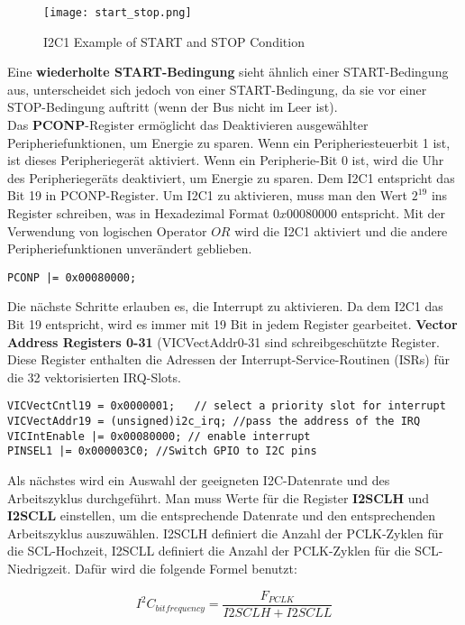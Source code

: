 \begin{figure}[!hb]
	\centering
	\texttt{[image: start\_stop.png]}
	\caption[I2C1 Example of START and STOP Condition]{I2C1 Example of START and STOP Condition}
	\label{fig:startstop}
\end{figure}

Eine \textbf{wiederholte START-Bedingung} sieht ähnlich einer START-Bedingung aus, unterscheidet sich jedoch von einer START-Bedingung, da sie vor einer STOP-Bedingung auftritt (wenn der Bus nicht im Leer ist).\\

Das \textbf{PCONP}-Register ermöglicht das Deaktivieren ausgewählter Peripheriefunktionen, um Energie zu sparen. Wenn ein Peripheriesteuerbit 1 ist, ist dieses Peripheriegerät aktiviert. Wenn ein Peripherie-Bit 0 ist, wird die Uhr des Peripheriegeräts deaktiviert, um Energie zu sparen. Dem I2C1 entspricht das Bit 19 in PCONP-Register. Um I2C1 zu aktivieren, muss man den Wert $2^{19}$ ins Register schreiben, was in Hexadezimal Format $0x00080000$ entspricht. Mit der Verwendung von logischen Operator $OR$ wird die I2C1 aktiviert und die andere Peripheriefunktionen unverändert geblieben.
\begin{lstlisting}
PCONP |= 0x00080000;
\end{lstlisting}
Die nächste Schritte erlauben es, die Interrupt zu aktivieren. Da dem I2C1 das Bit 19 entspricht, wird es immer mit 19 Bit in jedem Register gearbeitet. \textbf{Vector Address Registers 0-31} (VICVectAddr0-31 sind schreibgeschützte Register. Diese Register enthalten die Adressen der Interrupt-Service-Routinen (ISRs) für die 32 vektorisierten IRQ-Slots.
\begin{lstlisting}
VICVectCntl19 = 0x0000001;   // select a priority slot for interrupt
VICVectAddr19 = (unsigned)i2c_irq; //pass the address of the IRQ
VICIntEnable |= 0x00080000; // enable interrupt
PINSEL1 |= 0x000003C0; //Switch GPIO to I2C pins
\end{lstlisting}

Als nächstes wird ein Auswahl der geeigneten I2C-Datenrate und des Arbeitszyklus durchgeführt. Man muss Werte für die Register \textbf{I2SCLH} und \textbf{I2SCLL} einstellen, um die entsprechende Datenrate und den entsprechenden Arbeitszyklus auszuwählen. I2SCLH definiert die Anzahl der PCLK-Zyklen für die SCL-Hochzeit, I2SCLL definiert die Anzahl der PCLK-Zyklen für die SCL-Niedrigzeit. Dafür wird die folgende Formel benutzt:

\begin{equation}
I^2C_{bitfrequency} =  \frac{F_{PCLK}}{I2SCLH + I2SCLL }
\end{equation}\\

